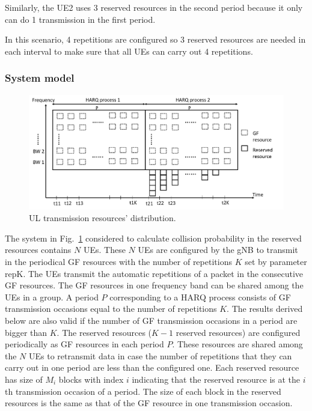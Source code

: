 \documentclass{ieeeaccess}
\begin{document}
Similarly, the UE2 uses 3 reserved resources in the second period because it only can do 1 transmission in the first period.

In this scenario, 4 repetitions are configured so 3 reserved resources are needed in each interval to make sure that all UEs can carry out 4 repetitions.

\subsubsection{System model}

\begin{figure}[htbp]
\centerline{\includegraphics[scale=0.25]{fig6.png}}
\caption{UL transmission resources' distribution.}
\label{fig6}
\vspace{-2mm}
\end{figure}

The system in Fig.~\ref{fig6} considered to calculate collision probability in the reserved resources contains $N$ UEs. These $N$ UEs are configured by the gNB to transmit in the periodical GF resources with the number of repetitions $K$ set by parameter repK. The UEs transmit the automatic repetitions of a packet in the consecutive GF resources. The GF resources in one frequency band can be shared among the UEs in a group. A period $P$ corresponding to a HARQ process consists of GF transmission occasions equal to the number of repetitions $K$. The results derived below are also valid if the number of GF transmission occasions in a period are bigger than $K$. The reserved resources ($K-1$ reserved resources) are configured periodically as GF resources in each period $P$. These resources are shared among the $N$ UEs to retransmit data in case the number of repetitions that they can carry out in one period are less than the configured one. Each reserved resource has size of $M_{i}$ blocks with index $i$ indicating that the reserved resource is at the $i$th transmission occasion of a period. The size of each block in the reserved resources is the same as that of the GF resource in one transmission occasion.
\end{document}

